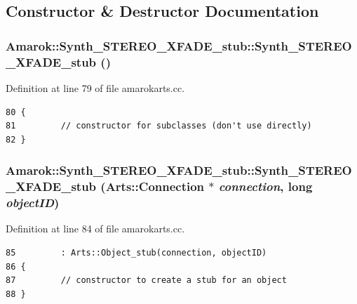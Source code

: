 \subsection{Constructor \& Destructor Documentation}
\subsubsection{\setlength{\rightskip}{0pt plus 5cm}Amarok::Synth\_\-STEREO\_\-XFADE\_\-stub::Synth\_\-STEREO\_\-XFADE\_\-stub ()\hspace{0.3cm}{\tt  [protected]}}\label{classAmarok_1_1Synth__STEREO__XFADE__stub_Amarok_1_1Synth__STEREO__XFADE__stubb0}




Definition at line 79 of file amarokarts.cc.



\footnotesize\begin{verbatim}80 {
81         // constructor for subclasses (don't use directly)
82 }
\end{verbatim}\normalsize 
{}
\subsubsection{\setlength{\rightskip}{0pt plus 5cm}Amarok::Synth\_\-STEREO\_\-XFADE\_\-stub::Synth\_\-STEREO\_\-XFADE\_\-stub (Arts::Connection $\ast$ {\em connection}, long {\em object\-ID})}\label{classAmarok_1_1Synth__STEREO__XFADE__stub_Amarok_1_1Synth__STEREO__XFADE__stuba0}




Definition at line 84 of file amarokarts.cc.



\footnotesize\begin{verbatim}85         : Arts::Object_stub(connection, objectID)
86 {
87         // constructor to create a stub for an object
88 }
\end{verbatim}\normalsize 



